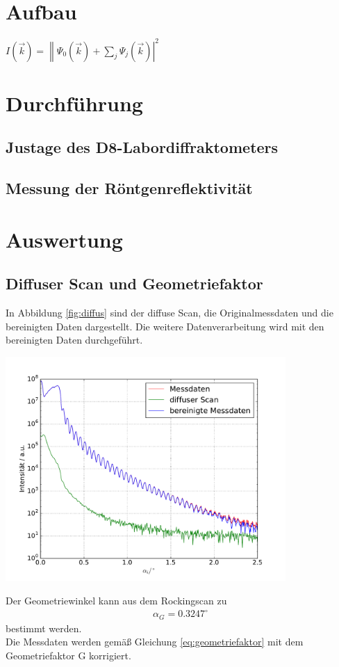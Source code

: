 \documentclass[captions=tableheading]{scrartcl}
\begin{document}
\section{Aufbau}
$I\left(\vec{k}\right)=\left\|\Psi_0\left(\vec{k}\right)+\sum\limits_j\Psi_j\left( \vec{k} \right) \right|^2$

\section{Durchführung}

\subsection{Justage des D8-Labordiffraktometers}

\subsection{Messung der Röntgenreflektivität}

\section{Auswertung}

\subsection{Diffuser Scan und Geometriefaktor}
In Abbildung \ref{fig:diffus} sind der diffuse Scan, die Originalmessdaten und die bereinigten Daten dargestellt. Die weitere Datenverarbeitung wird mit den bereinigten Daten durchgeführt.
\begin{center}
	\includegraphics[width=0.8\textwidth]{images/rawdata.pdf}
	\label{fig:diffus}
\end{center}
Der Geometriewinkel kann aus dem Rockingscan zu
\begin{align*}
\alpha_G=0.3247^{\circ}
\end{align*}
bestimmt werden. \\
Die Messdaten werden gemäß Gleichung \ref{eq:geometriefaktor} mit dem Geometriefaktor G korrigiert.
\end{document}
